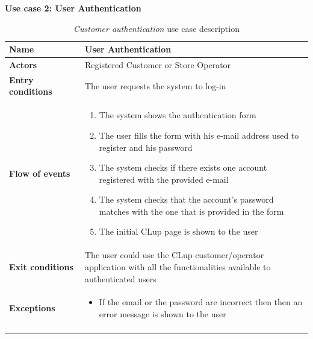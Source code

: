 \clearpage
\textbf{Use case 2: User Authentication}
\smallskip
{}
\begin{longtable}{p{0.25\linewidth}p{0.75\linewidth}}
    \toprule
    \textbf{Name}             & \textbf{User Authentication}                                                                                            \\
    \midrule
    \textbf{Actors}           & Registered Customer or Store Operator                                                                                   \\
    \midrule
    \textbf{Entry conditions} & The user requests the system to log-in                                                                                  \\
    \midrule
    \textbf{Flow of events}   &
    \begin{enumerate}
        \item The system shows the authentication form
        \item The user fills the form with his e-mail address used to register and his password
        \item The system checks if there exists one account registered with the provided e-mail
        \item The system checks that the account's password matches with the one that is provided in the form
        \item The initial CLup page is shown to the user
    \end{enumerate}                                                                                                                           \\
    \midrule
    \textbf{Exit conditions}  & The user could use the CLup customer/operator application with all the functionalities available to authenticated users \\
    \midrule
    \textbf{Exceptions}       &
    \begin{itemize}
        \item If the email or the password are incorrect then then an error message is shown to the user
    \end{itemize}                                                                                                                           \\
    \bottomrule
    \caption{\emph{Customer authentication} use case description}
\end{longtable}

